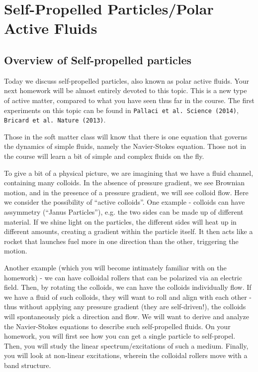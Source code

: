 \section{Self-Propelled Particles/Polar Active Fluids}

\subsection{Overview of Self-propelled particles}
Today we discuss self-propelled particles, also known as polar active fluids. Your next homework will be almost entirely devoted to this topic. This is a new type of active matter, compared to what you have seen thus far in the course. The first experiments on this topic can be found in \texttt{Pallaci et al.\ Science (2014)}, \texttt{Bricard et al.\ Nature (2013)}.

Those in the soft matter class will know that there is one equation that governs the dynamics of simple fluids, namely the Navier-Stokes equation. Those not in the course will learn a bit of simple and complex fluids on the fly.

To give a bit of a physical picture, we are imagining that we have a fluid channel, containing many colloids. In the absence of pressure gradient, we see Brownian motion, and in the presence of a pressure gradient, we will see colloid flow. Here we consider the possibility of ``active colloids''. One example - colloids can have assymmetry (``Janus Particles''), e.g. the two sides can be made up of different material. If we shine light on the particles, the different sides will heat up in different amounts, creating a gradient within the particle itself. It then acts like a rocket that launches fuel more in one direction than the other, triggering the motion.

Another example (which you will become intimately familiar with on the homework) - we can have colloidal rollers that can be polarized via an electric field. Then, by rotating the colloids, we can have the colloids individually flow. If we have a fluid of such colloids, they will want to roll and align with each other - thus without applying any pressure gradient (they are self-driven!), the colloids will spontaneously pick a direction and flow. We will want to derive and analyze the Navier-Stokes equations to describe such self-propelled fluids. On your homework, you will first see how you can get a single particle to self-propel. Then, you will study the linear spectrum/excitations of such a medium. Finally, you will look at non-linear excitations, wherein the colloidal rollers move with a band structure.

